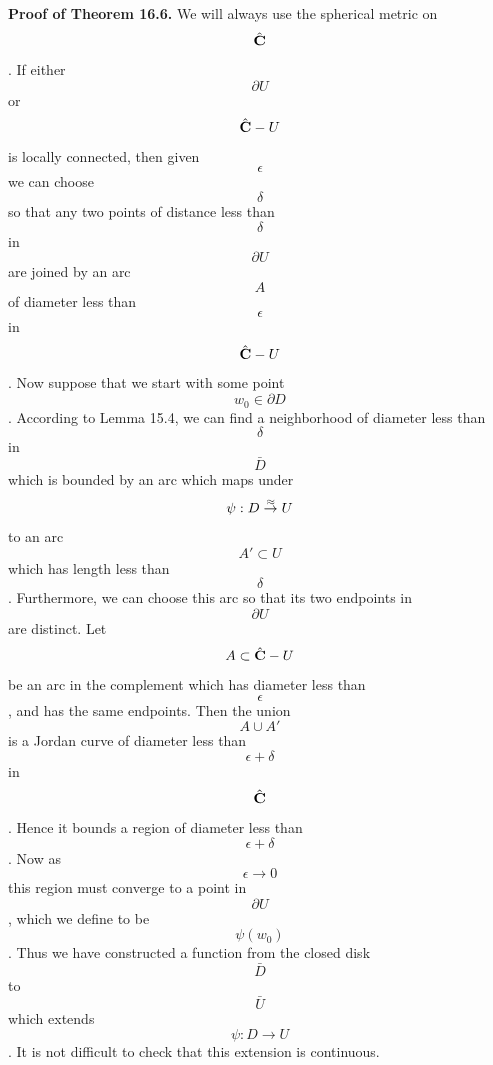 {\bf Proof of Theorem 16.6.} We will always use the spherical metric on
\[\hat{{\bf C}}\]. If either \[\partial U\] or \[\hat{{\bf C}}-U\] is
locally connected, then given \[\epsilon\] we can choose \[\delta\] so
that any two points of distance less than \[\delta\] in \[\partial U\] are
joined by an arc \[A\] of diameter less than \[\epsilon\] in \[\hat{{\bf C}}-U\].
Now suppose that we start with some point \[w_0\in\partial D\]. According to
Lemma 15.4, we can find a neighborhood of diameter less than \[\delta\] in
\[\bar D\] which is bounded by an arc which maps under \[\psi:D\buildrel
\approx\over\to U\] to an arc \[A'\subset U\] which has length less than \[\delta\].
Furthermore, we can choose this arc so that its two endpoints in \[\partial
U\] are distinct. Let \[A\subset\hat{{\bf C}}-U\] be an arc in the complement which
has diameter less than \[\epsilon\], and has the same endpoints. Then the union \[A\cup A'\] is a Jordan
curve of diameter less than \[\epsilon+\delta\] in \[\hat{{\bf C}}\]. Hence it
bounds a region of diameter less than \[\epsilon+\delta\]. Now as \[\epsilon
\to 0\] this region must converge to a point in \[\partial U\], which
we define to be \[\psi(w_0)\]. Thus we have constructed a function from the
closed disk \[\bar D\] to \[\bar U\] which extends \[\psi:D\to U\]. It
is not difficult to check that this extension is continuous.

